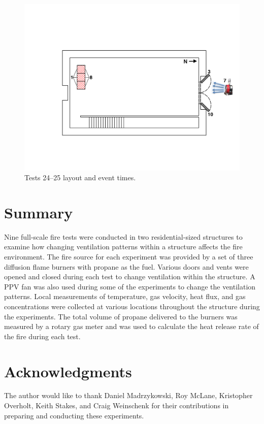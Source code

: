 \documentclass[12pt,oneside]{book}
\begin{document}
\begin{figure}[!ht]
\begin{minipage}[b]{0.9\columnwidth}
	\includegraphics[width=0.95\columnwidth]{../Figures/Floor_Plans/West_Structure_1st_Floor_Test_24}
\end{minipage}
\caption{Tests 24--25 layout and event times.}
\label{fig:west_test_24}
\end{figure}
\clearpage

\chapter{Summary}
\label{chap:Summary}
Nine full-scale fire tests were conducted in two residential-sized structures to examine how changing ventilation patterns within a structure affects the fire environment. The fire source for each experiment was provided by a set of three diffusion flame burners with propane as the fuel. Various doors and vents were opened and closed during each test to change ventilation within the structure. A PPV fan was also used during some of the experiments to change the ventilation patterns. Local measurements of temperature, gas velocity, heat flux, and gas concentrations were collected at various locations throughout the structure during the experiments. The total volume of propane delivered to the burners was measured by a rotary gas meter and was used to calculate the heat release rate of the fire during each test.


\chapter*{Acknowledgments}
\label{chap:acknowledgments}
The author would like to thank Daniel Madrzykowski, Roy McLane, Kristopher Overholt, Keith Stakes, and Craig Weinschenk for their contributions in preparing and conducting these experiments. 



\appendix
\end{document}
